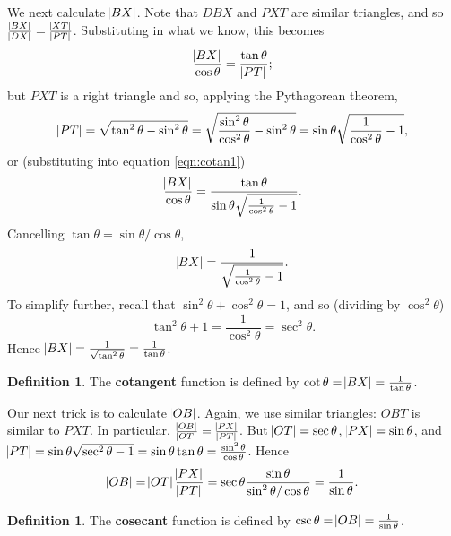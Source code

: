 \documentclass[a4paper,leqno]{article}
\newcommand{\marginsymbol}{\marginpar{\hfill(\ding{43})}}
\numberwithin{equation}{section}
\theoremstyle{definition}
\newtheorem{defn}[equation]{Definition}
\theoremstyle{remark}
\newcommand{\df}[1]{\textbf{#1}}
\begin{document}
We next calculate $ \abs{BX} $. Note that $ DBX $ and $ PXT $ are similar triangles, and so $ \frac{\abs{BX}}{\abs{DX}} = \frac{\abs{XT}}{\abs{PT}} $.
Substituting in what we know, this becomes
\begin{equation}\label{eqn:cotan1}
  \frac{\abs{BX}}{\cos \theta} = \frac{\tan \theta}{\abs{PT}};
\end{equation}
but $ PXT $ is a right triangle and so, applying the Pythagorean theorem,
\begin{displaymath}
  \abs{PT} = \sqrt{\tan^2 \theta - \sin^2 \theta} = \sqrt{\frac{\sin^2 \theta}{\cos^2 \theta} - \sin^2 \theta} = \sin \theta \sqrt{\frac{1}{\cos^2 \theta} - 1},
\end{displaymath}
or (substituting into equation \ref{eqn:cotan1})
\begin{displaymath}
  \frac{\abs{BX}}{\cos \theta} = \frac{\tan\theta}{\sin\theta \sqrt{\frac{1}{\cos^2 \theta} - 1}}.
\end{displaymath}
Cancelling $ \tan \theta = \sin \theta/\cos \theta $,
\begin{displaymath}
  \abs{BX} = \frac{1}{\sqrt{\frac{1}{\cos^2 \theta} - 1}}.
\end{displaymath}
To simplify further, recall that $ \sin^2 \theta + \cos^2 \theta = 1 $, and so (dividing by $ \cos^2 \theta $)
\marginsymbol\begin{equation}\label{eqn:tansecid}
  \tan^2 \theta + 1 = \frac{1}{\cos^2 \theta} = \sec^2 \theta.
\end{equation}
Hence $ \abs{BX} = \frac{1}{\sqrt{\tan^2 \theta}} = \frac{1}{\tan \theta} $.

\begin{defn}
  The \df{cotangent} function is defined by $ \cot \theta = \abs{BX} = \frac{1}{\tan \theta} $. \marginsymbol
\end{defn}

Our next trick is to calculate $ \abs{OB} $. Again, we use similar triangles: $ OBT $ is similar to $ PXT $. In
particular, $ \frac{\abs{OB}}{\abs{OT}} = \frac{\abs{PX}}{\abs{PT}} $. But $ \abs{OT} = \sec \theta $, $ \abs{PX} = \sin \theta $,
and $ \abs{PT} = \sin \theta \sqrt{\sec^2 \theta - 1} = \sin \theta \tan \theta = \frac{\sin^2 \theta}{\cos \theta} $. Hence
\begin{displaymath}
  \abs{OB} = \abs{OT} \frac{\abs{PX}}{\abs{PT}} = \sec \theta \frac{\sin \theta}{\sin^2 \theta/\cos \theta} = \frac{1}{\sin \theta}.
\end{displaymath}

\begin{defn}
  The \df{cosecant} function is defined by $ \csc \theta = \abs{OB} = \frac{1}{\sin \theta} $. \marginsymbol
\end{defn}
\end{document}
